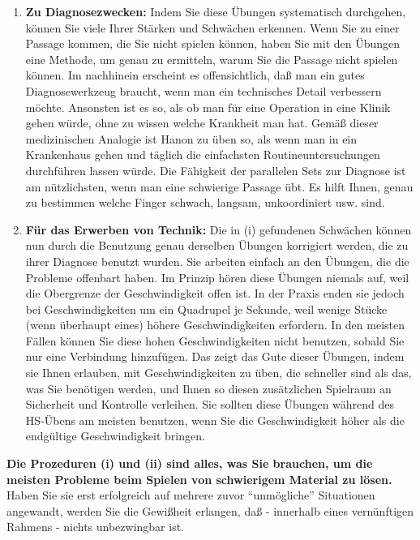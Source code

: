 \begin{enumerate}[label={\roman*.}] 
\item \textbf{Zu Diagnosezwecken:} Indem Sie diese Übungen systematisch durchgehen, können Sie viele Ihrer Stärken und Schwächen erkennen.
Wenn Sie zu einer Passage kommen, die Sie nicht spielen können, haben Sie mit den Übungen eine Methode, um genau zu ermitteln, warum Sie die Passage nicht spielen können.
Im nachhinein erscheint es offensichtlich, daß man ein gutes Diagnosewerkzeug braucht, wenn man ein technisches Detail verbessern möchte.
Ansonsten ist es so, als ob man für eine Operation in eine Klinik gehen würde, ohne zu wissen welche Krankheit man hat.
Gemäß dieser medizinischen Analogie ist Hanon zu üben so, als wenn man in ein Krankenhaus gehen und täglich die einfachsten Routineuntersuchungen durchführen lassen würde.
Die Fähigkeit der parallelen Sets zur Diagnose ist am nützlichsten, wenn man eine schwierige Passage übt.
Es hilft Ihnen, genau zu bestimmen welche Finger schwach, langsam, unkoordiniert usw. sind.


\item \textbf{Für das Erwerben von Technik:} Die in (i) gefundenen Schwächen können nun durch die Benutzung genau derselben Übungen korrigiert werden, die zu ihrer Diagnose benutzt wurden.
Sie arbeiten einfach an den Übungen, die die Probleme offenbart haben.
Im Prinzip hören diese Übungen niemals auf, weil die Obergrenze der Geschwindigkeit offen ist.
In der Praxis enden sie jedoch bei Geschwindigkeiten um ein Quadrupel je Sekunde, weil wenige Stücke (wenn überhaupt eines) höhere Geschwindigkeiten erfordern.
In den meisten Fällen können Sie diese hohen Geschwindigkeiten nicht benutzen, sobald Sie nur eine Verbindung hinzufügen.
Das zeigt das Gute dieser Übungen, indem sie Ihnen erlauben, mit Geschwindigkeiten zu üben, die schneller sind als das, was Sie benötigen werden, und Ihnen so diesen zusätzlichen Spielraum an Sicherheit und Kontrolle verleihen.
Sie sollten diese Übungen während des HS-Übens am meisten benutzen, wenn Sie die Geschwindigkeit höher als die endgültige Geschwindigkeit bringen.


\end{enumerate}
\textbf{Die Prozeduren (i) und (ii) sind alles, was Sie brauchen, um die meisten Probleme beim Spielen von schwierigem Material zu lösen.}
Haben Sie sie erst erfolgreich auf mehrere zuvor \enquote{unmögliche} Situationen angewandt, werden Sie die Gewißheit erlangen, daß - innerhalb eines vernünftigen Rahmens - nichts unbezwingbar ist.

